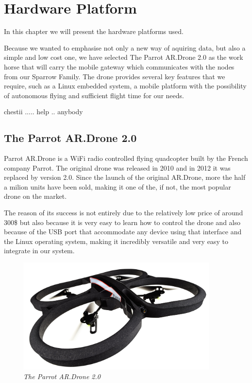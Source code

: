 \normalfont\normalsize
\chapter{Hardware Platform}

In this chapter we will present the hardware platforms used. 

Because we wanted to emphasise not only a new way of aquiring data, but also a simple and low cost one, we have selected The Parrot AR.Drone 2.0 as the work horse that will carry the mobile gateway which communicates with the nodes from our Sparrow Family. The drone provides several key features that we require, such as a Linux embedded system, a mobile platform with the possibility of autonomous flying and sufficient flight time for our needs.


chestii ..... help .. anybody

 

\section{The Parrot AR.Drone 2.0}

Parrot AR.Drone is a WiFi radio controlled flying quadcopter built by the French company Parrot.
The original drone was released in 2010 and in 2012 it was replaced by version 2.0. Since the launch of the original AR.Drone, more the half a milion units have been sold, making it one of the, if not, the most popular drone on the market.

The reason of its success is not entirely due to the relatively low price of around 300\$ but also because it is very easy to learn how to control the drone and also because of the USB port that accommodate any device using that interface and the Linux operating system, making it incredibly versatile and very easy to integrate in our system.


\begin{figure}[ht]
\begin{center}
\includegraphics[width=0.9\textwidth]{hw_platform/drone.jpg}
\end{center}
\caption{\small \itshape{The Parrot AR.Drone 2.0}}
\end{figure}


